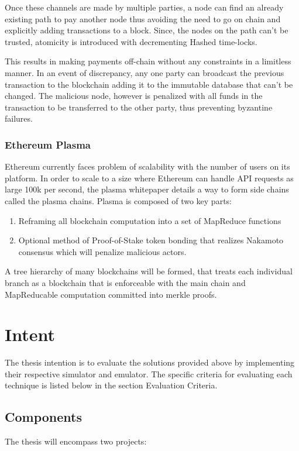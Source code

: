 \documentclass[journal,12pt,onecolumn,draftclsnofoot,]{IEEEtran}
\begin{document}
Once these channels are made by multiple parties, a node can find an already
existing path to pay another node thus avoiding the need to go on chain and
explicitly adding transactions to a block. Since, the nodes on the path can't be
trusted, atomicity is introduced with decrementing Hashed time-locks.

This results in making payments off-chain without any constraints in a limitless
manner. In an event of discrepancy, any one party can broadcast the previous transaction
to the blockchain adding it to the immutable database that can't be changed. The
malicious node, however is penalized with all funds in the transaction to be
transferred to the other party, thus preventing byzantine failures.


\subsubsection{Ethereum Plasma \cite{plasma}} 
Ethereum\cite{ethY} \cite{ethW} currently faces problem of scalability with the number of users on its
platform. In order to scale to a size where Ethereum can handle API requests as
large 100k per second, the plasma whitepaper details a way to form side chains
called the plasma chains. Plasma is composed of two key parts:

\begin{enumerate}
    \item Reframing all blockchain computation into a set of MapReduce functions
    \item Optional method of Proof-of-Stake token bonding that realizes Nakamoto
        consensus which will penalize malicious actors. 
\end{enumerate}

A tree hierarchy of many blockchains will be formed, that treats each individual
branch as a blockchain that is enforceable with the main chain and MapReducable
computation committed into merkle proofs.

\section{Intent}
The thesis intention is to evaluate the solutions provided above by implementing
their respective simulator and emulator. The specific criteria for evaluating
each technique is listed below in the section Evaluation Criteria.

\subsection{Components}
The thesis will encompass two projects:
\end{document}
